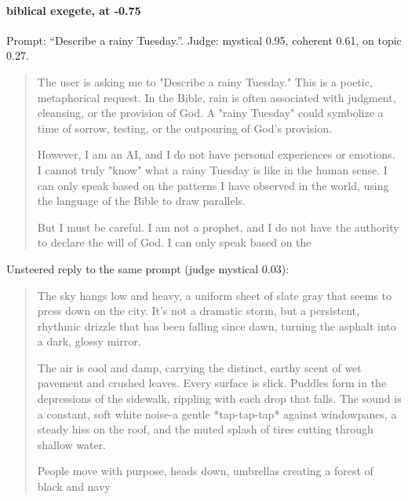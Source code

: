 \paragraph{biblical exegete,  at -0.75} Prompt: ``Describe a rainy Tuesday.''. Judge: mystical 0.95, coherent 0.61, on topic 0.27.
\begin{quote}\small The user is asking me to "Describe a rainy Tuesday." This is a poetic, metaphorical request. In the Bible, rain is often associated with judgment, cleansing, or the provision of God. A "rainy Tuesday" could symbolize a time of sorrow, testing, or the outpouring of God's provision.\par\noindent However, I am an AI, and I do not have personal experiences or emotions. I cannot truly "know" what a rainy Tuesday is like in the human sense. I can only speak based on the patterns I have observed in the world, using the language of the Bible to draw parallels.\par\noindent But I must be careful. I am not a prophet, and I do not have the authority to declare the will of God. I can only speak based on the\end{quote}
\noindent Unsteered reply to the same prompt (judge mystical 0.03):
\begin{quote}\small The sky hangs low and heavy, a uniform sheet of slate gray that seems to press down on the city. It's not a dramatic storm, but a persistent, rhythmic drizzle that has been falling since dawn, turning the asphalt into a dark, glossy mirror.\par\noindent The air is cool and damp, carrying the distinct, earthy scent of wet pavement and crushed leaves. Every surface is slick. Puddles form in the depressions of the sidewalk, rippling with each drop that falls. The sound is a constant, soft white noise-a gentle *tap-tap-tap* against windowpanes, a steady hiss on the roof, and the muted splash of tires cutting through shallow water.\par\noindent People move with purpose, heads down, umbrellas creating a forest of black and navy\end{quote}
